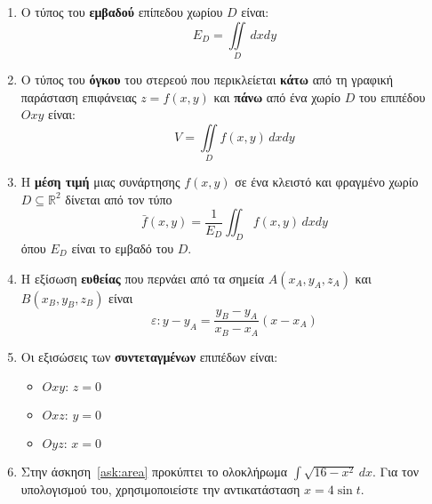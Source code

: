 \begin{enumerate}
  \item Ο τύπος του \textbf{εμβαδού} επίπεδου χωρίου $D$ είναι: 
    \[
      E_{D}=\iint\limits_{D}\,dxdy
    \]

  \item Ο τύπος του \textbf{όγκου} του στερεού που περικλείεται \textbf{κάτω} 
    από τη γραφική παράσταση επιφάνειας $z=f(x,y)$ και \textbf{πάνω} από ένα 
    χωρίο $D$ του επιπέδου $Oxy$ είναι: 
    \[
      V=\iint\limits_{D}f(x,y)\,dxdy
    \]

  \item Η \textbf{μέση τιμή} μιας συνάρτησης $ f(x,y) $ σε ένα κλειστό και 
    φραγμένο χωρίο $D\subseteq \mathbb{R}^{2}$ δίνεται από τον τύπο 
    \[
      \bar{f}(x, y) = \frac{1}{E_{D}} \iint_{D}f(x,y)\,dxdy
    \]
    όπου $ E_{D} $ είναι το εμβαδό του $D$.

  \item Η εξίσωση \textbf{ευθείας} που περνάει από τα σημεία $ A(x_{A},y_{A},z_{A}) $ 
    και $ B(x_{B},y_{B},z_{B}) $ είναι 
    \[
      \varepsilon : y - y_{A} = \frac{y_{B}-y_{A}}{x_{B}-x_{A}} (x-x_{A})
    \]

  \item Οι εξισώσεις των \textbf{συντεταγμένων} επιπέδων είναι:
    \begin{itemize}
      \item $Oxy: \, z=0$
      \item $Oxz: \, y=0$
      \item $Oyz: \, x=0$
    \end{itemize}

  \item Στην άσκηση~\ref{ask:area} προκύπτει το ολοκλήρωμα 
    $ \int \sqrt{16-x^{2}} \,{dx} $. Για τον υπολογισμού του, χρησιμοποιείστε την 
    αντικατάσταση $ x=4 \sin{t} $.
\end{enumerate}







